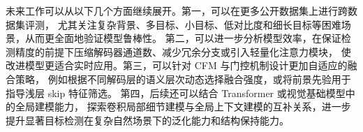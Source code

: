 \documentclass[UTF8,a4paper,10pt]{ctexart}
\begin{document}
未来工作可以从以下几个方面继续展开。第一，可以在更多公开数据集上进行跨数据集评测，
尤其关注复杂背景、多目标、小目标、低对比度和细长目标等困难场景，从而更全面地验证模型鲁棒性。
第二，可以进一步分析模型效率，在保证检测精度的前提下压缩解码器通道数、减少冗余分支或引入轻量化注意力模块，
使改进模型更适合实时应用。第三，可以针对 CFM 与门控机制设计更加自适应的融合策略，
例如根据不同解码层的语义层次动态选择融合强度，或将前景先验用于指导浅层 skip 特征筛选。
第四，后续还可以结合 Transformer 或视觉基础模型中的全局建模能力，
探索卷积局部细节建模与全局上下文建模的互补关系，进一步提升显著目标检测在复杂自然场景下的泛化能力和结构保持能力。

\label{LastMainPage}
\newpage


\end{document}
